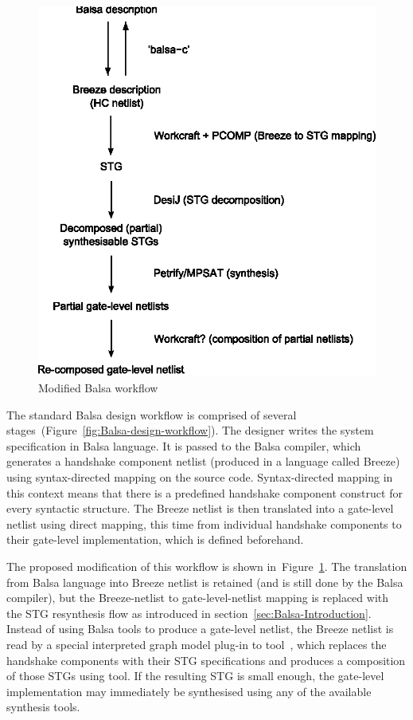 \begin{figure}
\centering
\includegraphics[width=0.40\paperwidth]{figures/balsa-workflow-modification}

\caption{Modified Balsa workflow\label{fig:Modified-Balsa-workflow}}
\end{figure}


The standard Balsa design workflow is comprised of several stages~(Figure~\ref{fig:Balsa-design-workflow}).
The designer writes the system specification in Balsa language. It
is passed to the Balsa compiler, which generates a handshake component
netlist (produced in a language called Breeze) using syntax-directed
mapping on the source code. Syntax-directed mapping in this context
means that there is a predefined handshake component construct for
every syntactic structure. The Breeze netlist is then translated into
a gate-level netlist using direct mapping, this time from individual
handshake components to their gate-level implementation, which is
defined beforehand.

The proposed modification of this workflow is shown in~Figure~\ref{fig:Modified-Balsa-workflow}.
The translation from Balsa language into Breeze netlist is retained
(and is still done by the Balsa compiler), but the Breeze-netlist
to gate-level-netlist mapping is replaced with the STG resynthesis
flow as introduced in section~\ref{sec:Balsa-Introduction}. Instead of
using Balsa tools to produce a gate-level netlist, the Breeze netlist
is read by a special interpreted graph model plug-in to tool~\cite{DBLP:conf/apn/PoliakovKY09}, which replaces the handshake
components with their STG specifications and produces a composition
of those STGs using  tool. If the resulting STG is small
enough, the gate-level implementation may immediately be synthesised
using any of the available synthesis tools.

